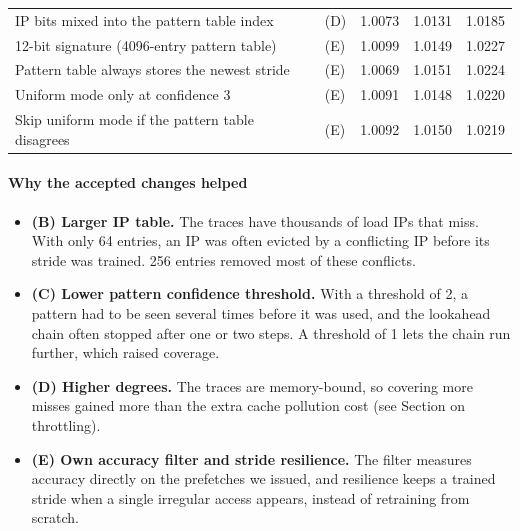 \documentclass[11pt,a4paper]{article}
\begin{document}
\begin{table}[H]
{\begin{tabular}{@{}llccc@{}}
      IP bits mixed into the pattern table index       & (D) & 1.0073 & 1.0131 & 1.0185 \\
      12-bit signature (4096-entry pattern table)      & (E) & 1.0099 & 1.0149 & 1.0227 \\
      Pattern table always stores the newest stride    & (E) & 1.0069 & 1.0151 & 1.0224 \\
      Uniform mode only at confidence 3                & (E) & 1.0091 & 1.0148 & 1.0220 \\
      Skip uniform mode if the pattern table disagrees & (E) & 1.0092 & 1.0150 & 1.0219 \\
      \bottomrule
    \end{tabular}%
    }
  \end{table}

  \paragraph{Why the accepted changes helped}
  \begin{itemize}
    \item \textbf{(B) Larger IP table.} The traces have thousands of load
      IPs that miss. With only 64 entries, an IP was often evicted by a
      conflicting IP before its stride was trained. 256 entries removed
      most of these conflicts.
    \item \textbf{(C) Lower pattern confidence threshold.} With a
      threshold of 2, a pattern had to be seen several times before it
      was used, and the lookahead chain often stopped after one or two
      steps. A threshold of 1 lets the chain run further, which raised
      coverage.
    \item \textbf{(D) Higher degrees.} The traces are memory-bound, so
      covering more misses gained more than the extra cache pollution
      cost (see Section on throttling).
    \item \textbf{(E) Own accuracy filter and stride resilience.} The
      filter measures accuracy directly on the prefetches we issued, and
      resilience keeps a trained stride when a single irregular access
      appears, instead of retraining from scratch.
  \end{itemize}
\end{document}
